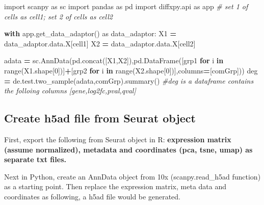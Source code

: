 \documentclass[
]{article}
\newenvironment{Shaded}{\begin{snugshade}}{\end{snugshade}}
\newcommand{\BuiltInTok}[1]{#1}
\newcommand{\CommentTok}[1]{\textcolor[rgb]{0.56,0.35,0.01}{\textit{#1}}}
\newcommand{\ControlFlowTok}[1]{\textcolor[rgb]{0.13,0.29,0.53}{\textbf{#1}}}
\newcommand{\DecValTok}[1]{\textcolor[rgb]{0.00,0.00,0.81}{#1}}
\newcommand{\ImportTok}[1]{#1}
\newcommand{\KeywordTok}[1]{\textcolor[rgb]{0.13,0.29,0.53}{\textbf{#1}}}
\newcommand{\NormalTok}[1]{#1}
\newcommand{\OperatorTok}[1]{\textcolor[rgb]{0.81,0.36,0.00}{\textbf{#1}}}
\newcommand{\StringTok}[1]{\textcolor[rgb]{0.31,0.60,0.02}{#1}}
\begin{document}
\begin{Shaded}
\begin{Highlighting}[]
\ImportTok{import}\NormalTok{ scanpy }\ImportTok{as}\NormalTok{ sc}
\ImportTok{import}\NormalTok{ pandas }\ImportTok{as}\NormalTok{ pd}
\ImportTok{import}\NormalTok{ diffxpy.api }\ImportTok{as}\NormalTok{ app}
\CommentTok{\# set 1 of cells as cell1; set 2 of cells as cell2}


\ControlFlowTok{with}\NormalTok{ app.get\_data\_adaptor() }\ImportTok{as}\NormalTok{ data\_adaptor:}
\NormalTok{  X1 }\OperatorTok{=}\NormalTok{ data\_adaptor.data.X[cell1]}
\NormalTok{  X2 }\OperatorTok{=}\NormalTok{ data\_adaptor.data.X[cell2]}


\NormalTok{adata }\OperatorTok{=}\NormalTok{ sc.AnnData(pd.concat([X1,X2]),pd.DataFrame([}\StringTok{\textquotesingle{}grp1\textquotesingle{}} \ControlFlowTok{for}\NormalTok{ i }\KeywordTok{in} \BuiltInTok{range}\NormalTok{(X1.shape[}\DecValTok{0}\NormalTok{])]}\OperatorTok{+}\NormalTok{[}\StringTok{\textquotesingle{}grp2\textquotesingle{}} \ControlFlowTok{for}\NormalTok{ i }\KeywordTok{in} \BuiltInTok{range}\NormalTok{(X2.shape[}\DecValTok{0}\NormalTok{])],columns}\OperatorTok{=}\NormalTok{[}\StringTok{\textquotesingle{}comGrp\textquotesingle{}}\NormalTok{]))}
\NormalTok{deg }\OperatorTok{=}\NormalTok{ de.test.two\_sample(adata,}\StringTok{\textquotesingle{}comGrp\textquotesingle{}}\NormalTok{).summary()}
\CommentTok{\#deg is a dataframe contains the folloing columns [\textquotesingle{}gene\textquotesingle{},\textquotesingle{}log2fc\textquotesingle{},\textquotesingle{}pval\textquotesingle{},\textquotesingle{}qval\textquotesingle{}]}
\end{Highlighting}
\end{Shaded}

\hypertarget{create-h5ad-file-from-seurat-object}{%
\subsection{Create h5ad file from Seurat object}\label{create-h5ad-file-from-seurat-object}}

First, export the following from Seurat object in R: \textbf{expression matrix (assume normalized), metadata and coordinates (pca, tsne, umap) as separate txt files.}

Next in Python, create an AnnData object from 10x (scanpy.read\_h5ad function) as a starting point. Then replace the expression matrix, meta data and coordinates as following, a h5ad file would be generated.
\end{document}
